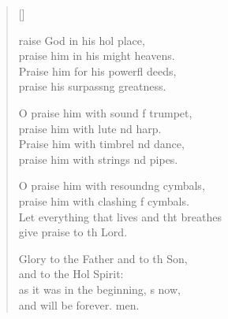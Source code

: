 \settowidth{\versewidth}{Let everything that lives and that breathes *}
\begin{verse}[\versewidth]
  \begin{patverse}
raise God in his hol place,\Med\\
praise him in his might heavens.\\
Praise him for his powerfl deeds,\Med\\
praise his surpass\pointup{\i}ng greatness.

O praise him with sound f trumpet,\Med\\
praise him with lute nd harp.\\
Praise him with timbrel nd dance,\Med\\
praise him with strings nd pipes.

O praise him with resound\pointup{\i}ng cymbals,\Med\\
praise him with clashing f cymbals.\\
Let everything that lives and tht breathes\Med\\
give praise to th Lord.

Glory to the Father and to th Son,\Med\\
and to the Hol Spirit:\\
as it was in the beginning, \pointup{\i}s now,\Med\\
and will be forever. men. 
  \end{patverse}
\end{verse}
